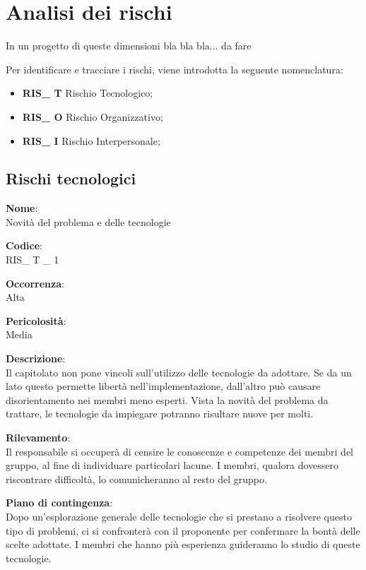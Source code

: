 \section{Analisi dei rischi}
In un progetto di queste dimensioni bla bla bla... da fare

Per identificare e tracciare i rischi, viene introdotta la seguente nomenclatura:
\begin{itemize}
	\item \textbf{RIS\_ T} Rischio Tecnologico;
	\item \textbf{RIS\_ O} Rischio Organizzativo;
	\item \textbf{RIS\_ I} Rischio Interpersonale;
\end{itemize}



\subsection{Rischi tecnologici}



{\setlength{\parindent}{0cm}
\begin{minipage}{\textwidth} 
\begin{multicols}{4}
\textbf{Nome}: \\ Novità del problema e delle tecnologie \columnbreak

\textbf{Codice}: \\ RIS\_ T \_ 1 
\columnbreak

\textbf{Occorrenza}: \\ Alta 
\columnbreak

\textbf{Pericolosità}: \\ Media

\end{multicols}

\begin{multicols}{3}

\textbf{Descrizione}: \\ Il capitolato non pone vincoli sull'utilizzo delle tecnologie da adottare. Se da un lato questo permette libertà nell'implementazione, dall'altro può causare disorientamento nei membri meno esperti. Vista la novità del problema da trattare, le tecnologie da impiegare potranno risultare nuove per molti.
\columnbreak

\textbf{Rilevamento}: \\ Il responsabile si occuperà di censire le conoscenze e competenze dei membri del gruppo, al fine di individuare particolari lacune. I membri, qualora dovessero riscontrare difficoltà, lo comunicheranno al resto del gruppo.  
\columnbreak

\textbf{Piano di contingenza}: \\ Dopo un'esplorazione generale delle tecnologie che si prestano a risolvere questo tipo di problemi, ci si confronterà con il proponente per confermare la bontà delle scelte adottate. I membri che hanno più esperienza guideranno lo studio di queste tecnologie.\\

\columnbreak
\end{multicols}
\end{minipage}} \\

